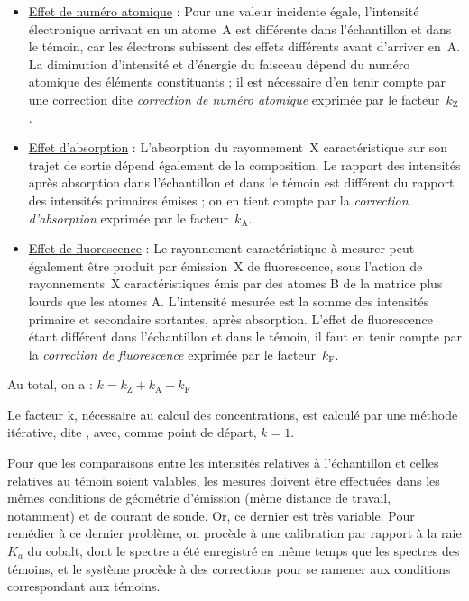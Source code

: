 \begin{itemize}
  \item \uline{Effet de numéro atomique} : Pour une valeur incidente 
        égale, l'intensité électronique arrivant en un atome~A est 
        différente dans l'échantillon et dans le témoin, car les 
        électrons subissent des effets différents avant d'arriver en~A.
        La diminution d'intensité et d'énergie du faisceau dépend du 
        numéro atomique des éléments constituants ; il est nécessaire 
        d'en tenir compte par une correction dite \emph{correction de 
        numéro atomique} exprimée par le facteur~$k_\text{Z}$.
  \item \uline{Effet d'absorption} : L'absorption du rayonnement~X 
        caractéristique sur son trajet de sortie dépend également 
        de la composition. Le rapport des intensités après absorption
        dans l'échantillon et dans le témoin est différent du rapport 
        des intensités primaires émises ; on en tient compte par 
        la \emph{correction d'absorption} exprimée par le
        facteur~$k_\text{A}$.
  \item \uline{Effet de fluorescence} : Le rayonnement caractéristique 
        à mesurer peut également être produit par émission~X de 
        fluorescence, sous l'action de rayonnements~X caractéristiques 
        émis par des atomes B de la matrice plus lourds que les atomes 
        A. L'intensité mesurée est la somme des intensités primaire et 
        secondaire sortantes, après absorption. L'effet de 
        fluorescence étant différent dans l'échantillon et dans le 
        témoin, il faut en tenir compte par la \emph{correction de 
        fluorescence} exprimée par le facteur~$k_\text{F}$.
\end{itemize}

Au total, on a : $k = k_\text{Z} + k_\text{A} + k_\text{F}$

Le facteur k, nécessaire au calcul des concentrations, est calculé par 
une méthode itérative, dite , avec, comme point 
de départ, $k=1$.

Pour que les comparaisons entre les intensités relatives à 
l'échantillon et celles relatives au témoin soient valables, les 
mesures doivent être effectuées dans les mêmes conditions de géométrie 
d'émission (même distance de travail, notamment) et de courant de 
sonde. Or, ce dernier est très variable. Pour remédier à ce dernier 
problème, on procède à une calibration par rapport à la raie $K_a$ 
du cobalt, dont le spectre a été enregistré en même temps que les 
spectres des témoins, et le système procède à des corrections pour 
se ramener aux conditions correspondant aux témoins.

